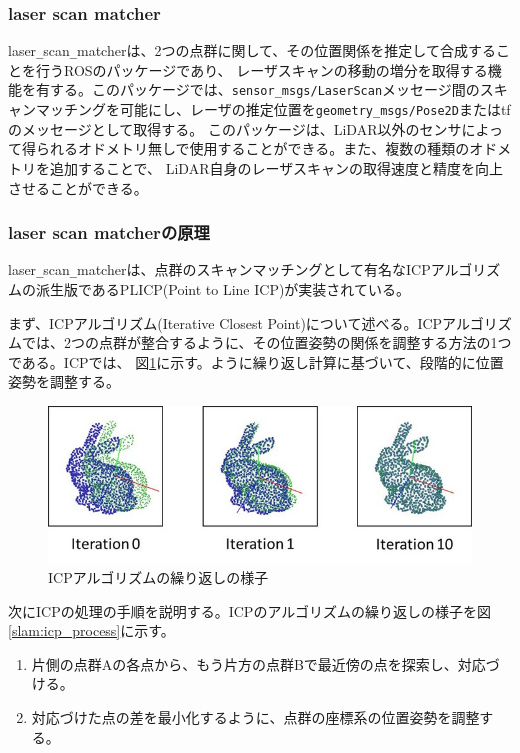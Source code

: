 \clearpage

\subsubsection{laser scan matcher}
laser\verb|_|scan\verb|_|matcherは、2つの点群に関して、その位置関係を推定して合成することを行うROSのパッケージであり、
レーザスキャンの移動の増分を取得する機能を有する。このパッケージでは、\verb|sensor_msgs/LaserScan|メッセージ間のスキャンマッチングを可能にし、レーザの推定位置を\verb|geometry_msgs/Pose2D|またはtfのメッセージとして取得する。
このパッケージは、LiDAR以外のセンサによって得られるオドメトリ無しで使用することができる。また、複数の種類のオドメトリを追加することで、
LiDAR自身のレーザスキャンの取得速度と精度を向上させることができる。

\subsubsection{laser scan matcherの原理}
laser\verb|_|scan\verb|_|matcherは、点群のスキャンマッチングとして有名なICPアルゴリズムの派生版であるPLICP(Point to Line ICP)が実装されている。

まず、ICPアルゴリズム(Iterative Closest Point)について述べる。ICPアルゴリズムでは、2つの点群が整合するように、その位置姿勢の関係を調整する方法の1つである。ICPでは、
図\ref{slam:icp1}に示す。ように繰り返し計算に基づいて、段階的に位置姿勢を調整する。

\begin{figure}[h]
  \begin{center}
    \includegraphics[width=.8\linewidth]{img/slam_24.jpg}
    \caption{ICPアルゴリズムの繰り返しの様子}
    \label{slam:icp1}
  \end{center}
\end{figure}

次にICPの処理の手順を説明する。ICPのアルゴリズムの繰り返しの様子を図\ref{slam:icp_process}に示す。
\begin{enumerate}
  \item 片側の点群Aの各点から、もう片方の点群Bで最近傍の点を探索し、対応づける。
  \item 対応づけた点の差を最小化するように、点群の座標系の位置姿勢を調整する。
\end{enumerate}

